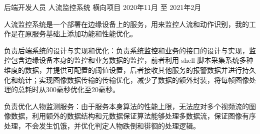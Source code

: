\begin{cventries}

  \cventry
  {后端开发人员} %
  {人流监控系统} %
  {横向项目} %
  {2020年11月 至 2021年2月} %
  {
    \begin{cvitems} %
      \setlength\itemsep{1mm}
      \item {人流监控系统是一个部署在边缘设备上的服务，用来监控人流和动作识别，我的工作是在原服务基础上添加功能和性能优化。}
      \item {负责后端系统的设计与实现和优化：负责系统监控和业务的接口的设计与实现，监控包含边缘设备本身的监控和业务数据的监控，前者利用 shell 脚本采集系统多种维度的数据，并提供可配置的阈值设置，后者接收其他服务的报警数据并进行持久化和统计；实现图像数据传输的传输优化，减少了数据的额外封装，将每帧图像处理的总耗时从300毫秒优化至20毫秒。}
      \item {负责优化人物监测服务：由于服务本身算法的性能上限，无法应对多个视频流的图像数据，利用额外的数据结构和元数据保证算法能够处理多数据流，保证图像有序处理，不会发生饥饿，并优化判定人物跌倒和徘徊的处理逻辑。}
    \end{cvitems}
  }


\end{cventries}
